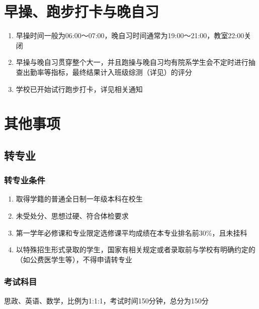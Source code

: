 \section[早操、跑步打卡与晚自习]{早操、跑步打卡与晚自习}
\begin{enumerate}
    \item 早操时间一般为06:00～07:00，晚自习时间通常为19:00～21:00，教室22:00关闭
    \item 早操与晚自习贯穿整个大一\footnotemark，并且跑操与晚自习均有院系学生会不定时进行抽查出勤率等指标，最终结果计入班级综测（详见）的评分
    \item 学校已开始试行跑步打卡，详见相关通知
\end{enumerate}

\section[其他事项]{其他事项}

\subsection[转专业]{转专业\footnotemark}

\subsubsection[转专业条件]{转专业条件}
\begin{enumerate}
    \item 取得学籍的普通全日制一年级本科在校生
    \item 未受处分、思想过硬、符合体检要求
    \item 第一学年必修课和专业限定选修课平均成绩在本专业排名前30\%，且未挂科
    \item 以特殊招生形式录取的学生，国家有相关规定或者录取前与学校有明确约定的（如公费医学生等），不得申请转专业
\end{enumerate}

\subsubsection[考试科目]{考试科目}
思政、英语\footnotemark、数学，比例为1:1:1，考试时间150分钟，总分为150分

